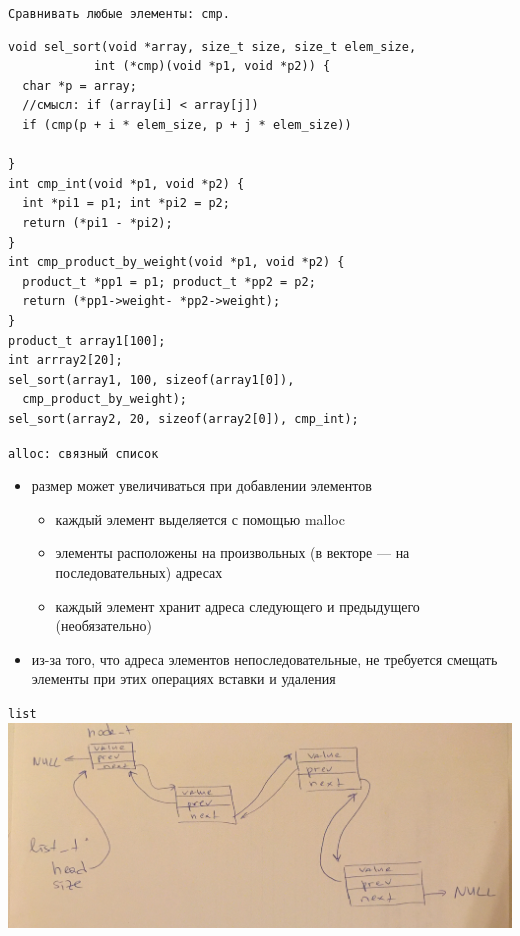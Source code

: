 \documentclass[pdf, 10pt, unicode]{beamer}
\begin{document}
\begin{frame}[fragile]{{\tt Сравнивать любые элементы: cmp.}}
\begin{lstlisting}
void sel_sort(void *array, size_t size, size_t elem_size,
            int (*cmp)(void *p1, void *p2)) {
  char *p = array;
  //смысл: if (array[i] < array[j])
  if (cmp(p + i * elem_size, p + j * elem_size))

}
int cmp_int(void *p1, void *p2) {
  int *pi1 = p1; int *pi2 = p2;
  return (*pi1 - *pi2);
}
int cmp_product_by_weight(void *p1, void *p2) {
  product_t *pp1 = p1; product_t *pp2 = p2;
  return (*pp1->weight- *pp2->weight);
}
product_t array1[100];
int arrray2[20];
sel_sort(array1, 100, sizeof(array1[0]),
  cmp_product_by_weight);
sel_sort(array2, 20, sizeof(array2[0]), cmp_int);
\end{lstlisting}

\end{frame}


\begin{frame}[fragile]{{\tt alloc: связный список}}

\begin{itemize}
  \item размер может увеличиваться при добавлении элементов
    \begin{itemize}
        \item каждый элемент выделяется с помощью malloc
        \item элементы расположены на произвольных (в векторе --- на последовательных) адресах
        \item каждый элемент хранит адреса следующего и предыдущего (необязательно)
    \end{itemize}
    \item из-за того, что адреса элементов непоследовательные, не требуется смещать элементы при этих операциях вставки и удаления

\end{itemize}

\end{frame}

\begin{frame}[fragile]{{\tt list}}
    \includegraphics[scale=0.1]{list_in_mem}
\end{frame}
\end{document}
